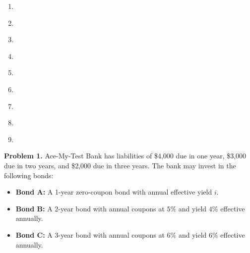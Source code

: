 \documentclass[12pt]{article}
\begin{document}
\begin{enumerate}
\item \underline{\hspace{1.5cm}}

\vspace{0.6cm}

\item \underline{\hspace{1.5cm}}

\vspace{0.6cm}

\item \underline{\hspace{1.5cm}}

\vspace{0.6cm}

\item \underline{\hspace{1.5cm}}

\vspace{0.6cm}

\item \underline{\hspace{1.5cm}}

\vspace{0.6cm}

\item \underline{\hspace{1.5cm}}

\vspace{0.6cm}

\item \underline{\hspace{1.5cm}}

\vspace{0.6cm}

\item \underline{\hspace{1.5cm}}

\vspace{0.6cm}

\item \underline{\hspace{1.5cm}}
\end{enumerate}

\newpage

\newpage
\noindent \textbf{Problem 1.}
Ace-My-Test Bank has liabilities of \$4,000 due in one year, 
\$3,000 due in two years, and \$2,000 due in three years. The bank may invest in the following bonds:

\begin{itemize}
    \item \textbf{Bond A:} A 1-year zero-coupon bond with annual effective yield $i$.
    \item \textbf{Bond B:} A 2-year bond with annual coupons at $5\%$ and yield $4\%$ effective annually.
    \item \textbf{Bond C:} A 3-year bond with annual coupons at $6\%$ and yield $6\%$ effective annually.
\end{itemize}
\end{document}

